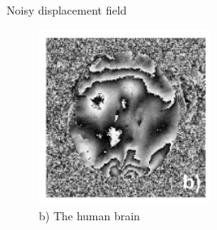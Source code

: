 \begin{frame}{Noisy displacement field}

\begin{figure}
\includegraphics[width=0.5\textwidth]{Images/noisyBrain.png}
\caption{b) The human brain}
\centering\end{figure}

\end{frame}


